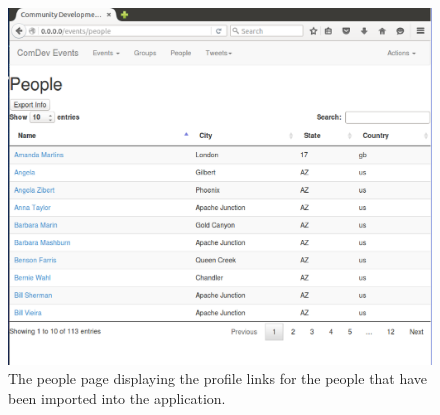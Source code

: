 \documentclass[draftclsnofoot,10pt,onecolumn]{IEEEtran} %
\begin{document}
\begin{figure}[H]
  \begin{center}
	\includegraphics[width=5in, frame]{peoplePage}
	\captionsetup{width=.4\linewidth}
	\centering
  \caption{The people page displaying the profile links for the people that have been imported into the application.}
  \end{center}
\end{figure}
\end{document}
